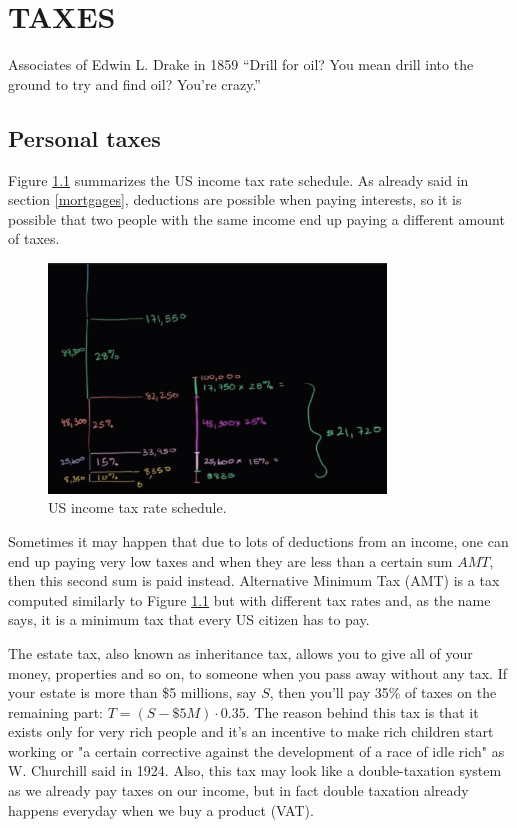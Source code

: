 \chapter{TAXES}
\begin{chapquote}{Associates of Edwin L. Drake in 1859}
``Drill for oil? You mean drill into the ground to try and find oil? You're crazy.''
\end{chapquote}

\section{Personal taxes} \label{Personal taxes}

Figure \ref{fig:tax_rate_schedule} summarizes the US income tax rate schedule. As already said in section \ref{mortgages}, deductions are possible when paying interests, so it is possible that two people with the same income end up paying a different amount of taxes. 

\begin{figure}[h!]
\centering
\includegraphics[width=0.8\textwidth]{images/tax_rate_schedule.png}
\caption{US income tax rate schedule.}
\label{fig:tax_rate_schedule}
\end{figure}

Sometimes it may happen that due to lots of deductions from an income, one can end up paying very low taxes and when they are less than a certain sum $AMT$, then this second sum is paid instead.  Alternative Minimum Tax (AMT) is a tax computed similarly to Figure \ref{fig:tax_rate_schedule} but with different tax rates and, as the name says, it is a minimum tax that every US citizen has to pay.

The estate tax, also known as inheritance tax, allows you to give all of your money, properties and so on, to someone when you pass away without any tax. If your estate is more than \$5 millions, say $S$, then you'll pay 35\% of taxes on the remaining part: $T = (S - \$5M) \cdot 0.35$. The reason behind this tax is that it exists only for very rich people and it's an incentive to make rich children start working or "a certain corrective against the development of a race of idle rich" as W. Churchill said in 1924. Also, this tax may look like a double-taxation system as we already pay taxes on our income, but in fact double taxation already happens everyday when we buy a product (VAT). 

